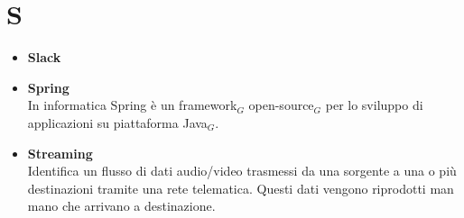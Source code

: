 \chapter{S} \label{S}
\begin{itemize}
	\item \textbf{Slack} \\
	
	\item \textbf{Spring}\\
	In informatica Spring è un framework$_G$ open-source$_G$ per lo sviluppo di applicazioni su piattaforma Java$_G$.
	
	\item \textbf{Streaming}\\
	Identifica un flusso di dati audio/video trasmessi da una sorgente a una o più destinazioni tramite una rete telematica. Questi dati vengono riprodotti man mano che arrivano a destinazione.
	
\end{itemize}
	